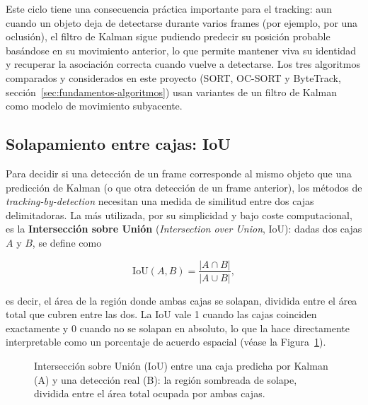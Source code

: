Este ciclo tiene una consecuencia práctica importante para el tracking: aun
cuando un objeto deja de detectarse durante varios frames (por ejemplo, por
una oclusión), el filtro de Kalman sigue pudiendo predecir su posición
probable basándose en su movimiento anterior, lo que permite mantener viva
su identidad y recuperar la asociación correcta cuando vuelve a detectarse.
Los tres algoritmos comparados y considerados en este proyecto (SORT,
OC-SORT y ByteTrack, sección~\ref{sec:fundamentos-algoritmos}) usan
variantes de un filtro de Kalman como modelo de movimiento subyacente.

\subsection{Solapamiento entre cajas: IoU}
\label{subsec:fundamentos-iou}

Para decidir si una detección de un frame corresponde al mismo objeto que
una predicción de Kalman (o que otra detección de un frame anterior), los
métodos de \emph{tracking-by-detection} necesitan una medida de similitud
entre dos cajas delimitadoras. La más utilizada, por su simplicidad y bajo
coste computacional, es la \textbf{Intersección sobre Unión} (\emph{Intersection
over Union}, IoU): dadas dos cajas $A$ y $B$, se define como

\begin{equation}
\mathrm{IoU}(A, B) = \frac{|A \cap B|}{|A \cup B|},
\label{eq:fundamentos-iou}
\end{equation}

es decir, el área de la región donde ambas cajas se solapan, dividida entre
el área total que cubren entre las dos. La IoU vale 1 cuando las cajas
coinciden exactamente y 0 cuando no se solapan en absoluto, lo que la hace
directamente interpretable como un porcentaje de acuerdo espacial (véase la
Figura~\ref{fig:fundamentos-iou}).

\begin{figure}[htp]
\centering
{}
\caption{Intersección sobre Unión (IoU) entre una caja predicha por Kalman
(A) y una detección real (B): la región sombreada de solape, dividida entre
el área total ocupada por ambas cajas.}
\label{fig:fundamentos-iou}
\end{figure}


